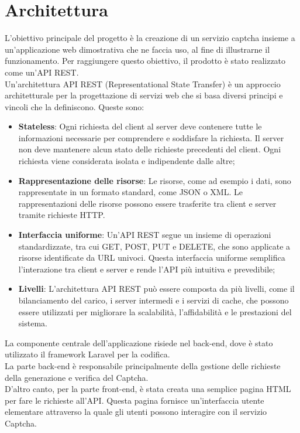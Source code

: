 \section{Architettura}
L'obiettivo principale del progetto è la creazione di un servizio captcha insieme a un'applicazione web 
dimostrativa che ne faccia uso, al fine di illustrarne il funzionamento. Per raggiungere questo obiettivo, 
il prodotto è stato realizzato come un'API REST.\\
Un'architettura API REST (Representational State Transfer) è un approccio architetturale per la progettazione di servizi web che si basa diversi principi e vincoli che la definiscono.
Queste sono:
\begin{itemize}
	\item \textbf{Stateless}: Ogni richiesta del client al server deve contenere tutte le informazioni necessarie per comprendere e soddisfare la richiesta. Il server non deve mantenere alcun stato delle richieste precedenti del client. Ogni richiesta viene considerata isolata e indipendente dalle altre;
	\item \textbf{Rappresentazione delle risorse}: Le risorse, come ad esempio i dati, sono rappresentate in un formato standard, come JSON o XML. Le rappresentazioni delle risorse possono essere trasferite tra client e server tramite richieste HTTP.
	\item \textbf{Interfaccia uniforme}:  Un'API REST segue un insieme di operazioni standardizzate, tra cui GET, POST, PUT e DELETE, che sono applicate a risorse identificate da URL univoci. Questa interfaccia uniforme semplifica l'interazione tra client e server e rende l'API più intuitiva e prevedibile;
	\item \textbf{Livelli}:  L'architettura API REST può essere composta da più livelli, come il bilanciamento del carico, i server intermedi e i servizi di cache, che possono essere utilizzati per migliorare la scalabilità, l'affidabilità e le prestazioni del sistema.\\
\end{itemize}

La componente centrale dell'applicazione risiede nel back-end, dove è stato utilizzato il framework Laravel per la codifica.\\
La parte back-end è responsabile principalmente della gestione delle richieste della generazione e verifica del Captcha. \\
D'altro canto, per la parte front-end, è stata creata una semplice pagina HTML per fare le richieste all'API. Questa pagina fornisce un'interfaccia utente elementare attraverso la quale gli utenti possono interagire con il servizio Captcha.

